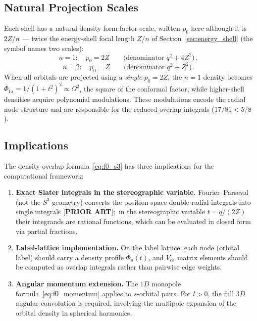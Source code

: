 \documentclass[aps,pra,twocolumn,superscriptaddress,longbibliography]{revtex4-2}
\begin{document}
\subsection{Natural Projection Scales}

Each shell has a natural density form-factor scale, written $p_0$
here although it is $2Z/n$ --- twice the energy-shell focal length $Z/n$
of Section~\ref{sec:energy_shell} (the symbol names two scales):
\begin{equation}
  n = 1: \quad p_0 = 2Z \qquad\text{(denominator } q^2 + 4Z^2\text{)} \,,
\end{equation}
\begin{equation}
  n = 2: \quad p_0 = Z \qquad\text{(denominator } q^2 + Z^2\text{)} \,.
\end{equation}
When all orbitals are projected using a \emph{single} $p_0 = 2Z$, the
$n=1$ density becomes $\Phi_{1s} = 1/(1+t^2)^2 \propto \Omega^2$, the
square of the conformal factor,
while higher-shell densities acquire polynomial modulations. These
modulations encode the radial node structure and are responsible for
the reduced overlap integrals ($17/81 < 5/8$).

\subsection{Implications}
\label{sec:vee_implications}

The density-overlap formula~\eqref{eq:f0_s3} has three implications
for the computational framework:

\begin{enumerate}
  \item \textbf{Exact Slater integrals in the stereographic variable.}
    Fourier--Parseval (not the $S^3$ geometry) converts the position-space
    double radial integrals into single integrals \textbf{[PRIOR ART]};\ in
    the stereographic variable $t = q/(2Z)$ their integrands are rational
    functions, which can be evaluated in closed form via partial fractions.

  \item \textbf{Label-lattice implementation.}
    On the label lattice, each node (orbital label) should
    carry a density profile $\Phi_a(t)$, and $V_{ee}$ matrix elements
    should be computed as overlap integrals rather than pairwise edge
    weights.

  \item \textbf{Angular momentum extension.}
    The $1D$ monopole formula~\eqref{eq:f0_momentum} applies to
    $s$-orbital pairs. For $l > 0$, the full $3D$ angular convolution
    is required, involving the multipole expansion of the orbital
    density in spherical harmonics.
\end{enumerate}
\end{document}

